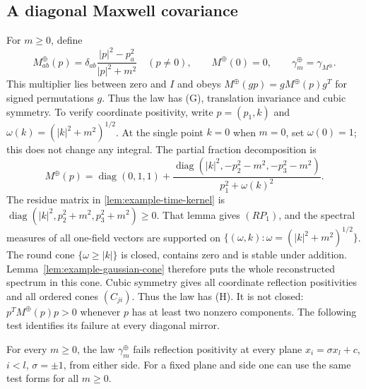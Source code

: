 \documentclass[11pt,letterpaper,reqno]{amsart}
\makeatletter
\theoremstyle{definition}
\newcommand{\ms@minorstart}{%
  \pushQED{\qed}\renewcommand{\qedsymbol}{$\blacksquare$}}
\newenvironment{proposition}[1][]{\ms@minorstart\ms@proposition[#1]}
  {\popQED\endms@proposition}
\theoremstyle{remark}
\makeatother
\begin{document}
\subsection{A diagonal Maxwell covariance}

For $m\ge0$, define
\[
 M^\oplus_{ab}(p)=\delta_{ab}\frac{|p|^2-p_a^2}{|p|^2+m^2}
 \quad(p\ne0),\qquad M^\oplus(0)=0,
 \qquad \gamma_m^\oplus=\gamma_{M^\oplus}.
\]
This multiplier lies between zero and $I$ and obeys
$M^\oplus(gp)=gM^\oplus(p)g^T$ for signed permutations $g$.
Thus the law has (G), translation invariance and cubic symmetry.
To verify coordinate positivity, write $p=(p_1,k)$ and
$\omega(k)=(|k|^2+m^2)^{1/2}$. At the single point $k=0$ when
$m=0$, set $\omega(0)=1$; this does not change any integral.
The partial fraction decomposition is
\[
 M^\oplus(p)=\operatorname{diag}(0,1,1)
  +\frac{\operatorname{diag}(|k|^2,-p_2^2-m^2,-p_3^2-m^2)}
             {p_1^2+\omega(k)^2}.
\]
The residue matrix in \cref{lem:example-time-kernel} is
$\operatorname{diag}(|k|^2,p_2^2+m^2,p_3^2+m^2)\ge0$.
That lemma gives $(RP_1)$, and the spectral measures of all
one-field vectors are supported on
$\{(\omega,k):\omega=(|k|^2+m^2)^{1/2}\}$.
The round cone $\{\omega\ge|k|\}$ is closed, contains zero and
is stable under addition. Lemma~\ref{lem:example-gaussian-cone}
therefore puts the whole reconstructed spectrum in this cone.
Cubic symmetry gives all coordinate reflection positivities and
all ordered cones $(C_{ji})$. Thus the law has (H).
It is not closed: $p^TM^\oplus(p)p>0$ whenever $p$ has at least
two nonzero components. The following test identifies its failure
at every diagonal mirror.

\begin{proposition}\label{prop:diagonal-maxwell}
For every $m\ge0$, the law $\gamma_m^\oplus$ fails reflection
positivity at every plane $x_i=\sigma x_l+c$, $i<l$, $\sigma=\pm1$,
from either side. For a fixed plane and side one can use the same
test forms for all $m\ge0$.
\end{proposition}
\end{document}

